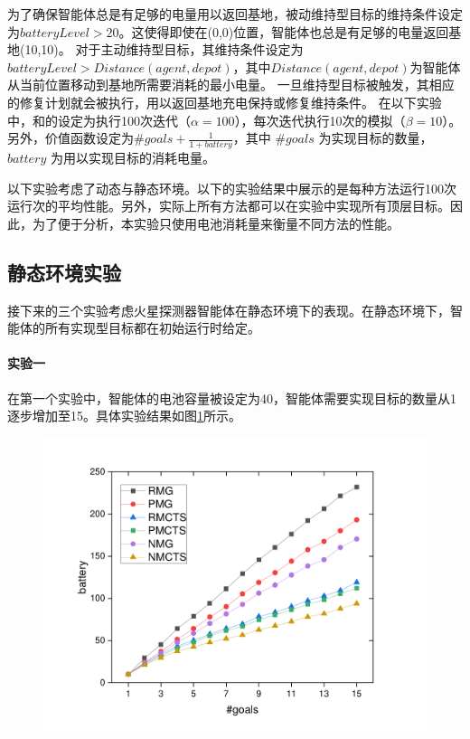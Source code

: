 %
为了确保智能体总是有足够的电量用以返回基地，被动维持型目标的维持条件设定为$batteryLevel > 20$。这使得即使在(0,0)位置，智能体也总是有足够的电量返回基地(10,10)。
%
对于主动维持型目标，其维持条件设定为$batteryLevel > Distance(agent, depot)$，其中$Distance(agent, depot)$为智能体从当前位置移动到基地所需要消耗的最小电量。
%
一旦维持型目标被触发，其相应的修复计划就会被执行，用以返回基地充电保持或修复维持条件。
%
在以下实验中，\SAM 和\SA 的设定为执行100次迭代（$\alpha = 100$），每次迭代执行10次的模拟（$\beta = 10$）。另外，价值函数设定为$\#goals + \frac{1}{1 + {battery}}$，其中 $\#goals$ 为实现目标的数量， $battery$ 为用以实现目标的消耗电量。

以下实验考虑了动态与静态环境。以下的实验结果中展示的是每种方法运行100次运行次的平均性能。另外，实际上所有方法都可以在实验中实现所有顶层目标。因此，为了便于分析，本实验只使用电池消耗量来衡量不同方法的性能。
\subsection{静态环境实验}
接下来的三个实验考虑火星探测器智能体在静态环境下的表现。在静态环境下，智能体的所有实现型目标都在初始运行时给定。
\paragraph{实验一}
在第一个实验中，智能体的电池容量被设定为40，智能体需要实现目标的数量从1逐步增加至15。具体实验结果如图\ref{fig:static1}所示。
\begin{figure}[!h]
\centering
\includegraphics[scale=0.4]{./figs/gX_cY_fixCap40.pdf}
\captionsetup{justification=centering}
\label{fig:static1}
\end{figure}

